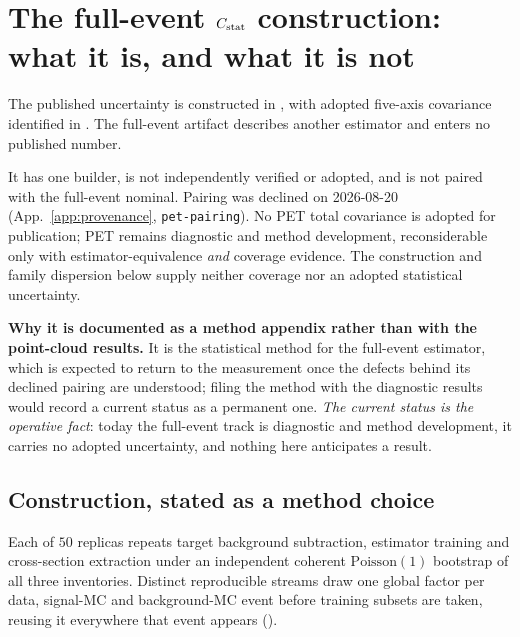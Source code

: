 \section{The full-event $C_{\rm stat}$ construction: what it is, and what it is not}
\label{app:cstatlimit}

The published uncertainty is constructed in , with adopted five-axis covariance identified in . The full-event artifact describes another estimator and enters no published number.

It has one builder, is not independently verified or adopted, and is not paired with the full-event nominal. Pairing was declined on 2026-08-20 (App.~\ref{app:provenance}, \texttt{pet-pairing}). No PET total covariance is adopted for publication; PET remains diagnostic and method development, reconsiderable only with estimator-equivalence \emph{and} coverage evidence. The construction and family dispersion below supply neither coverage nor an adopted statistical uncertainty.

\noindent\textbf{Why it is documented as a method appendix rather than with the point-cloud results.}  It is the statistical method for the full-event estimator, which is expected to return to the measurement once the defects behind its declined pairing are understood; filing the method with the diagnostic results would record a current status as a permanent one.  \emph{The current status is the operative fact}: today the full-event track is diagnostic and method development, it carries no adopted uncertainty, and nothing here anticipates a result.

\subsection{Construction, stated as a method choice}

Each of $50$ replicas repeats target background subtraction, estimator training and cross-section extraction under an independent coherent $\mathrm{Poisson}(1)$ bootstrap of all three inventories. Distinct reproducible streams draw one global factor per data, signal-MC and background-MC event before training subsets are taken, reusing it everywhere that event appears ().


